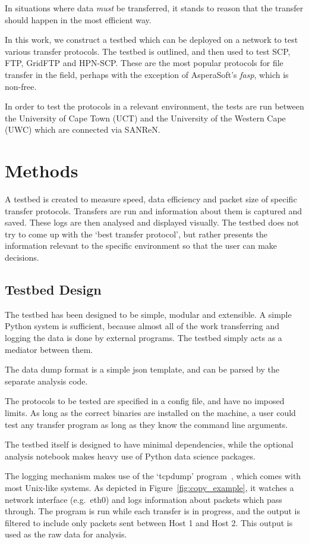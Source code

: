 \documentclass{sig-alternate-05-2015}
\begin{document}
In situations where data \textit{must} be transferred, it stands to reason that the transfer should happen in the most efficient way.

In this work, we construct a testbed which can be deployed on a network to test various transfer protocols. The testbed is outlined, and then used to test SCP, FTP, GridFTP and HPN-SCP. These are the most popular protocols for file transfer in the field, perhaps with the exception of AsperaSoft's \textit{fasp}, which is non-free. 

In order to test the protocols in a relevant environment, the tests are run between the University of Cape Town (UCT) and the University of the Western Cape (UWC) which are connected via SANReN.

\section{Methods}
A testbed is created to measure speed, data efficiency and packet size of specific transfer protocols. Transfers are run and information about them is captured and saved. These logs are then analysed and displayed visually. The testbed does not try to come up with the `best transfer protocol', but rather presents the information relevant to the specific environment so that the user can make decisions.

\subsection{Testbed Design}
The testbed has been designed to be simple, modular and extensible. A simple Python system is sufficient, because almost all of the work transferring and logging the data is done by external programs. The testbed simply acts as a mediator between them.

The data dump format is a simple json template, and can be parsed by the separate analysis code.

The protocols to be tested are specified in a config file, and have no imposed limits. As long as the correct binaries are installed on the machine, a user could test any transfer program as long as they know the command line arguments.

The testbed itself is designed to have minimal dependencies, while the optional analysis notebook makes heavy use of Python data science packages.

The logging mechanism makes use of the `tcpdump' program~\cite{tcpdump}, which comes with most Unix-like systems. As depicted in Figure~\ref{fig:copy_example}, it watches a network interface (e.g.\ eth0) and logs information about packets which pass through. The program is run while each transfer is in progress, and the output is filtered to include only packets sent between Host 1 and Host 2. This output is used as the raw data for analysis.
\end{document}
